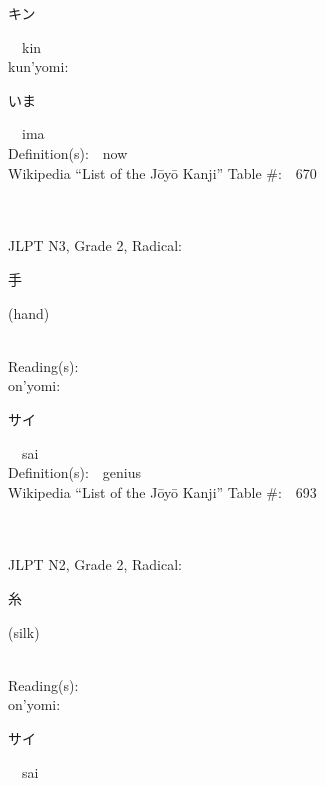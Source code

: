 \begin{multicols}{2}
{\hspace*{2em}}{\begin{CJK}{UTF8}{min} キン \end{CJK}}\ \ kin\ \ \\
{\hspace*{1em}}kun'yomi:\ \ \\
{\hspace*{2em}}{\begin{CJK}{UTF8}{min} いま \end{CJK}}\ \ ima\ \ \\
Definition(s):\ \ now \\
Wikipedia ``List of the J\=oy\=o Kanji'' Table \#:\ \ 670 \\
\ \ \\
{\fontsize{34pt}{40pt}  }\ \ \\  %
{JLPT N3, Grade 2, Radical:\ \ {\begin{CJK}{UTF8}{min} 手 \end{CJK}} (hand) } \\
Reading(s):\ \ \\
{\hspace*{1em}}on'yomi:\ \ \\
{\hspace*{2em}}{\begin{CJK}{UTF8}{min} サイ \end{CJK}}\ \ sai\ \ \\
Definition(s):\ \ genius \\
Wikipedia ``List of the J\=oy\=o Kanji'' Table \#:\ \ 693 \\
\ \ \\
{\fontsize{34pt}{40pt}  }\ \ \\  %
{JLPT N2, Grade 2, Radical:\ \ {\begin{CJK}{UTF8}{min} 糸 \end{CJK}} (silk) } \\
Reading(s):\ \ \\
{\hspace*{1em}}on'yomi:\ \ \\
{\hspace*{2em}}{\begin{CJK}{UTF8}{min} サイ \end{CJK}}\ \ sai\ \ \\

\end{multicols}
